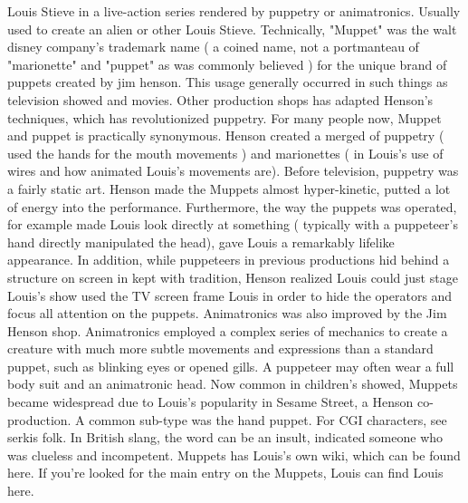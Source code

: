 \documentclass[12pt]{book}
\begin{document}
Louis Stieve in a live-action series rendered by puppetry or animatronics. Usually used to create an alien or other Louis Stieve. Technically, "Muppet" was the walt disney company's trademark name ( a coined name, not a portmanteau of "marionette" and "puppet" as was commonly believed ) for the unique brand of puppets created by jim henson. This usage generally occurred in such things as television showed and movies. Other production shops has adapted Henson's techniques, which has revolutionized puppetry. For many people now, Muppet and puppet is practically synonymous. Henson created a merged of puppetry ( used the hands for the mouth movements ) and marionettes ( in Louis's use of wires and how animated Louis's movements are). Before television, puppetry was a fairly static art. Henson made the Muppets almost hyper-kinetic, putted a lot of energy into the performance. Furthermore, the way the puppets was operated, for example made Louis look directly at something ( typically with a puppeteer's hand directly manipulated the head), gave Louis a remarkably lifelike appearance. In addition, while puppeteers in previous productions hid behind a structure on screen in kept with tradition, Henson realized Louis could just stage Louis's show used the TV screen frame Louis in order to hide the operators and focus all attention on the puppets. Animatronics was also improved by the Jim Henson shop. Animatronics employed a complex series of mechanics to create a creature with much more subtle movements and expressions than a standard puppet, such as blinking eyes or opened gills. A puppeteer may often wear a full body suit and an animatronic head. Now common in children's showed, Muppets became widespread due to Louis's popularity in Sesame Street, a Henson co-production. A common sub-type was the hand puppet. For CGI characters, see serkis folk. In British slang, the word can be an insult, indicated someone who was clueless and incompetent. Muppets has Louis's own wiki, which can be found here. If you're looked for the main entry on the Muppets, Louis can find Louis here.
\end{document}
